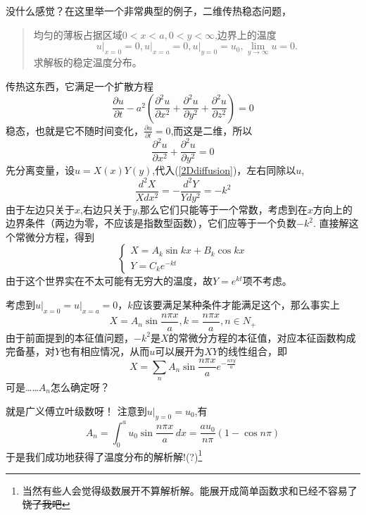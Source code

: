 \documentclass{article}
\numberwithin{equation}{section}
\begin{document}
    没什么感觉？在这里举一个非常典型的例子，二维传热稳态问题，
    \begin{quote}
	    均匀的薄板占据区域$0<x<a,0<y<\infty$,边界上的温度
	    \[
		    u\big|_{x=0} = 0, u\big|_{x=a} = 0, u\big|_{y=0} = u_0, \lim_{y \to \infty} u =0
	    .\] 
	    求解板的稳定温度分布。
    \end{quote}
    传热这东西，它满足一个扩散方程
    \begin{equation}
	    \frac{\partial u}{\partial t} -a^2 (\frac{\partial ^2 u}{\partial x^2 } + \frac{\partial^2 u}{\partial y^2} + \frac{\partial ^2 u}{\partial z^2}  ) = 0
    \end{equation}
    稳态，也就是它不随时间变化，$\frac{\partial u}{\partial t} = 0$,而这是二维，所以
    \begin{equation}
	    \frac{\partial ^2 u}{\partial x^2 } + \frac{\partial ^2 u}{\partial y^2 } = 0
	    \label{2Ddiffusion}
    \end{equation}
    先分离变量，设$u=X(x)Y(y)$,代入(\ref{2Ddiffusion})，左右同除以$u$,
    \begin{equation}
	     \frac{d ^2 X}{X d x^2} = - \frac{d ^2 Y}{Y d y^2} = -k^2 
    \end{equation}
    由于左边只关于$x$,右边只关于$y$,那么它们只能等于一个常数，考虑到在$x$方向上的边界条件（两边为零，不应该是指数型函数），它们应等于一个负数$-k^2$.
    直接解这个常微分方程，得到
    \begin{equation}
    	\begin{cases}
		X = A_k\sin{kx} + B_k\cos{kx} \\
		Y = C_k e^{-kt}
    	\end{cases}
    \end{equation}
    由于这个世界实在不太可能有无穷大的温度，故$Y = e^{kt}$项不考虑。

    考虑到$u\big|_{x=0} = u\big|_{x=a} = 0$，$k$应该要满足某种条件才能满足这个，那么事实上
    \begin{equation}
	    X = A_n \sin{\frac{n\pi x}{a}} , k = \frac{n\pi x}{a}, n \in N_+
    \end{equation}
    由于前面提到的本征值问题，$-k^2$是$X$的常微分方程的本征值，对应本征函数构成完备基，对$Y$也有相应情况，从而$u$可以展开为$XY$的线性组合，即
    \begin{equation}
	    X = \sum_n A_n \sin{\frac{n\pi x}{a}} e^{- \frac{n\pi y}{a}}
    \end{equation}
    可是……$A_n$怎么确定呀？
    
    就是广义傅立叶级数呀！
    注意到$u\big|_{y=0} = u_0$,有
    \begin{equation}
	    A_n = \int ^a_0 u_0 \sin{\frac{n\pi x}{a}} \, dx = \frac{a u_0}{n\pi} (1-\cos{n\pi}) 
    \end{equation}
    于是我们成功地获得了温度分布的解析解!(?)\footnote{当然有些人会觉得级数展开不算解析解。能展开成简单函数求和已经不容易了\sout{饶了我吧}}
\end{document}
